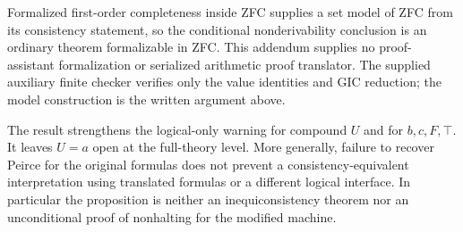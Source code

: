 Formalized first-order completeness inside ZFC supplies a set model
of ZFC from its consistency statement, so the conditional
nonderivability conclusion is an ordinary theorem formalizable in
ZFC.  This addendum supplies no proof-assistant formalization or
serialized arithmetic proof translator.  The supplied auxiliary
finite checker verifies only the value identities and GIC reduction;
the model construction is the written argument above.

The result strengthens the logical-only warning for compound $U$
and for $b,c,F,\top$.  It leaves $U=a$ open at the full-theory level.
More generally, failure to recover Peirce for the original formulas
does not prevent a consistency-equivalent interpretation using
translated formulas or a different logical interface.  In
particular the proposition is neither an inequiconsistency theorem
nor an unconditional proof of nonhalting for the modified machine.
